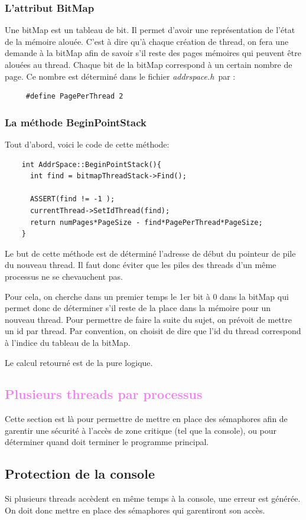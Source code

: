 \documentclass[a4paper,10pt]{report}
\begin{document}
  \textcolor{TealBlue}{\subsubsection*{L'attribut BitMap}}
    Une bitMap est un tableau de bit. Il permet d'avoir une représentation de l'état de la mémoire alouée. C'est à dire qu'à chaque création de thread,
    on fera une demande à la bitMap afin de savoir s'il reste des pages mémoires qui peuvent être alouées au thread. Chaque bit de la bitMap correspond à
    un certain nombre de page. Ce nombre est déterminé dans le fichier \emph{addrspace.h} par : 
    \begin{lstlisting}
     #define PagePerThread 2
    \end{lstlisting}
    \newpage
   \textcolor{TealBlue}{\subsubsection*{La méthode BeginPointStack}}
   Tout d'abord, voici le code de cette méthode:
      \begin{lstlisting}
    int AddrSpace::BeginPointStack(){
      int find = bitmapThreadStack->Find();

      ASSERT(find != -1 );
      currentThread->SetIdThread(find);
      return numPages*PageSize - find*PagePerThread*PageSize;
    }
      \end{lstlisting}
   Le but de cette méthode est de déterminé l'adresse de début du pointeur de pile du nouveau thread. Il faut donc éviter que les piles des threads 
   d'un même processus ne se chevauchent pas.
   
   Pour cela, on cherche dans un premier temps le 1er bit à 0 dans la bitMap qui permet donc de déterminer s'il reste de la place dans la mémoire pour un
   nouveau thread. Pour permettre de faire la suite du sujet, on prévoit de mettre un id par thread. Par convention, on choisit de dire que l'id du thread
   correspond à l'indice du tableau de la bitMap.

   Le calcul retourné est de la pure logique.
   
   \textcolor{Violet}{\section{Plusieurs threads par processus}}
      Cette section est là pour permettre de mettre en place des sémaphores afin de garentir une sécurité à l'accès de zone critique (tel que la console),
      ou pour déterminer quand doit terminer le programme principal.
      \textcolor{NavyBlue}{\subsection{Protection de la console}}
      Si plusieurs threads accèdent en même temps à la console, une erreur est générée. On doit donc mettre en place des sémaphores qui garentiront 
      son accès.
      
\end{document}
